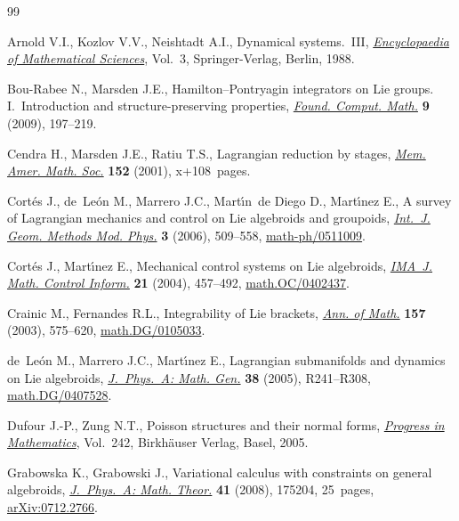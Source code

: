 \documentclass[10pt,a4paper]{amsart}
\numberwithin{equation}{section}
\begin{document}
\begin{thebibliography}{99}
\footnotesize\itemsep=0pt

Arnold V.I., Kozlov V.V., Neishtadt A.I., Dynamical systems.~{III},
 \href{https://doi.org/10.1007/978-3-662-02535-2}{\textit{Encyclopaedia of Mathematical Sciences}}, Vol.~3, Springer-Verlag,
 Berlin, 1988.

Bou-Rabee N., Marsden J.E., Hamilton--{P}ontryagin integrators on {L}ie groups.
 {I}.~{I}ntroduction and structure-preserving properties, \href{https://doi.org/10.1007/s10208-008-9030-4}{\textit{Found.
 Comput. Math.}} \textbf{9} (2009), 197--219.

Cendra H., Marsden J.E., Ratiu T.S., Lagrangian reduction by stages,
 \href{https://doi.org/10.1090/memo/0722}{\textit{Mem. Amer. Math. Soc.}} \textbf{152} (2001), x+108~pages.

Cort\'es J., de~Le\'on M., Marrero J.C., Mart\'{\i}n~de Diego D., Mart\'{\i}nez
 E., A survey of {L}agrangian mecha\-nics and control on {L}ie algebroids and
 groupoids, \href{https://doi.org/10.1142/S0219887806001211}{\textit{Int.~J. Geom. Methods Mod. Phys.}} \textbf{3} (2006),
 509--558, \mbox{\href{http://arxiv.org/abs/math-ph/0511009}{math-ph/0511009}}.

Cort\'es J., Mart\'{\i}nez E., Mechanical control systems on {L}ie algebroids,
 \href{https://doi.org/10.1093/imamci/21.4.457}{\textit{IMA~J. Math. Control Inform.}} \textbf{21} (2004), 457--492,
 \href{http://arxiv.org/abs/#2}{math.OC/0402437}.

Crainic M., Fernandes R.L., Integrability of {L}ie brackets, \href{https://doi.org/10.4007/annals.2003.157.575}{\textit{Ann. of
 Math.}} \textbf{157} (2003), 575--620, \href{http://arxiv.org/abs/math.DG/0105033}{math.DG/0105033}.

de~Le\'on M., Marrero J.C., Mart\'{\i}nez E., Lagrangian submanifolds and
 dynamics on {L}ie algebroids, \href{https://doi.org/10.1088/0305-4470/38/24/R01}{\textit{J.~Phys.~A: Math. Gen.}} \textbf{38}
 (2005), R241--R308, \href{http://arxiv.org/abs/math.DG/0407528}{math.DG/0407528}.

Dufour J.-P., Zung N.T., Poisson structures and their normal forms,
 \href{https://doi.org/10.1007/b137493}{\textit{Progress in Mathematics}}, Vol.~242, Birkh\"auser Verlag, Basel, 2005.

Grabowska K., Grabowski J., Variational calculus with constraints on general
 algebroids, \href{https://doi.org/10.1088/1751-8113/41/17/175204}{\textit{J.~Phys.~A: Math. Theor.}} \textbf{41} (2008), 175204,
 25~pages, \href{http://arxiv.org/abs/0712.2766}{arXiv:0712.2766}.


\end{thebibliography}
\end{document}
